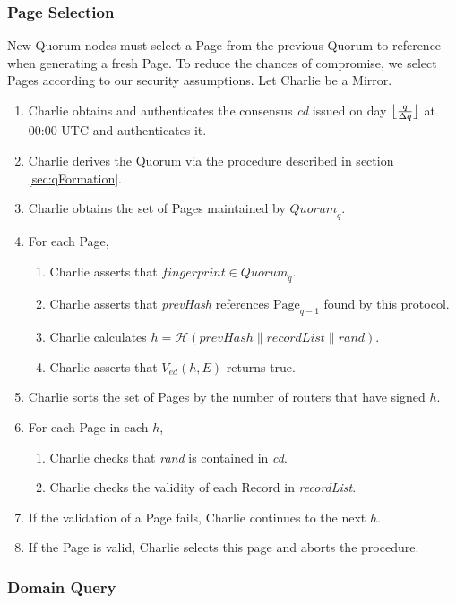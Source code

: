 \documentclass[conference]{IEEEtran}
\DeclarePairedDelimiter{\floor}{\lfloor}{\rfloor}
\newcommand*\concat{\mathbin{\|}}
\begin{document}
\subsubsection{Page Selection}

New Quorum nodes must select a Page from the previous Quorum to reference when generating a fresh Page. To reduce the chances of compromise, we select Pages according to our security assumptions. Let Charlie be a Mirror.

\begin{enumerate}
	\item Charlie obtains and authenticates the consensus \emph{cd} issued on day $ \floor[\big]{\frac{q}{\Delta q}} $ at 00:00 UTC and authenticates it.
	\item Charlie derives the Quorum via the procedure described in section \ref{sec:qFormation}.
	\item Charlie obtains the set of Pages maintained by $ \mathit{Quorum}_{q} $.
	\item For each Page,
		\begin{enumerate}
			\item Charlie asserts that $ \mathit{fingerprint} \in \mathit{Quorum}_{q} $.
			\item Charlie asserts that \emph{prevHash} references $ \mathrm{Page}_{q-1} $ found by this protocol.
			\item Charlie calculates $ h = \mathcal{H}(\mathit{prevHash} \concat \mathit{recordList} \concat \mathit{rand}) $.
			\item Charlie asserts that $ V_{\mathit{ed}}(h, E) $ returns true.
		\end{enumerate}
	\item Charlie sorts the set of Pages by the number of routers that have signed $ h $.
	\item For each Page in each $ h $,
		\begin{enumerate}
			\item Charlie checks that \emph{rand} is contained in \emph{cd}.
			\item Charlie checks the validity of each Record in \emph{recordList}.
		\end{enumerate}
	\item If the validation of a Page fails, Charlie continues to the next $ h $.
	\item If the Page is valid, Charlie selects this page and aborts the procedure.
\end{enumerate}

\subsubsection{Domain Query}
\end{document}
